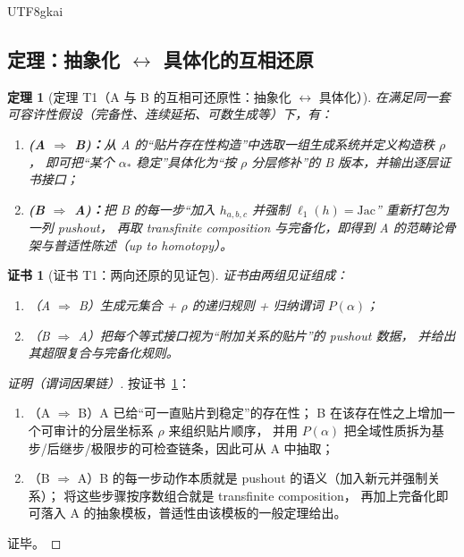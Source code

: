 \documentclass[12pt]{article}
\newtheorem{theorem}{定理}[section]
\newtheorem{Certificate}{证书}[section]
\begin{document}
\begin{CJK*}{UTF8}{gkai}
\subsection{定理：抽象化 \texorpdfstring{$\leftrightarrow$}{<->} 具体化的互相还原}
\label{subsec:tex27-ch27-theorem}

\begin{theorem}[定理 T1（A 与 B 的互相可还原性：抽象化 $\leftrightarrow$ 具体化）]
\label{thm:tex27-ch27-t1}
在满足同一套可容许性假设（完备性、连续延拓、可数生成等）下，有：
\begin{enumerate}
  \item \textbf{(A $\Rightarrow$ B)：}从 A 的“贴片存在性构造”中选取一组生成系统并定义构造秩 $\rho$，
  即可把“某个 $\alpha_\ast$ 稳定”具体化为“按 $\rho$ 分层修补”的 B 版本，并输出逐层证书接口；
  \item \textbf{(B $\Rightarrow$ A)：}把 B 的每一步“加入 $h_{a,b,c}$ 并强制 $\ell_1(h)=\mathrm{Jac}$”
  重新打包为一列 pushout，
  再取 transfinite composition 与完备化，即得到 A 的范畴论骨架与普适性陈述（up to homotopy）。
\end{enumerate}
\end{theorem}

\begin{Certificate}[证书 T1：两向还原的见证包]
\label{cert:tex27-ch27-t1}
证书由两组见证组成：
\begin{enumerate}
  \item （A $\Rightarrow$ B）生成元集合 + $\rho$ 的递归规则 + 归纳谓词 $P(\alpha)$；
  \item （B $\Rightarrow$ A）把每个等式接口视为“附加关系的贴片”的 pushout 数据，
  并给出其超限复合与完备化规则。
\end{enumerate}
\end{Certificate}

\begin{proof}[证明（谓词因果链）]
按证书~\ref{cert:tex27-ch27-t1}：
\begin{enumerate}
  \item （A $\Rightarrow$ B）A 已给“可一直贴片到稳定”的存在性；
  B 在该存在性之上增加一个可审计的分层坐标系 $\rho$ 来组织贴片顺序，
  并用 $P(\alpha)$ 把全域性质拆为基步/后继步/极限步的可检查链条，因此可从 A 中抽取；
  \item （B $\Rightarrow$ A）B 的每一步动作本质就是 pushout 的语义（加入新元并强制关系）；
  将这些步骤按序数组合就是 transfinite composition，
  再加上完备化即可落入 A 的抽象模板，普适性由该模板的一般定理给出。
\end{enumerate}
证毕。
\end{proof}


\end{CJK*}
\end{document}
